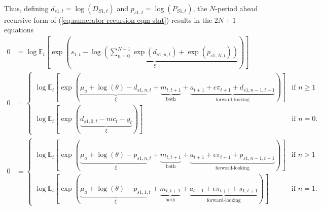 \documentclass[12 pt, oneside]{article}
\theoremstyle{definition}
\theoremstyle{definition}
\theoremstyle{definition}
\newcommand{\E}{\mathbb{E}}
\begin{document}
Thus, defining $d_{s1, t} = \log(D_{S1, t})$ and $p_{s1, t} = \log(P_{S1, t})$,
the $N$-period ahead recursive form of (\ref{eq:numerator recursion eqm stat}) results in the $2N + 1$ equations
\begin{align}
  0 & = \log\E_t\left[\exp\left(\underbrace{s_{1, t} - \log\left(\sum_{n = 0}^{N - 1}\exp(d_{s1, n, t}) + \exp(p_{s1, N, t})\right)}_{\xi}\right)\right]\\
  0 & =
      \begin{cases}
        \log\E_t\left[\exp\left(\underbrace{\mu_a + \log(\theta) - d_{s1, n, t}}_{\xi} + \underbrace{m_{t, t + 1}}_{\text{both}} + \underbrace{a_{t + 1} + \epsilon \pi_{t + 1} + d_{s1, n - 1, t + 1}}_{\text{forward-looking}}\right)\right] & \text{if } n \geq 1\\
        \log\E_t\left[\exp\left(\underbrace{d_{s1, 0, t} - mc_t - y_t}_{\xi}\right)\right] & \text{if } n = 0.
      \end{cases}\\
  0 & =
      \begin{cases}
        \log\E_t\left[\exp\left(\underbrace{\mu_a + \log(\theta) - p_{s1, n, t}}_{\xi} + \underbrace{m_{t, t + 1}}_{\text{both}} + \underbrace{a_{t + 1} + \epsilon \pi_{t + 1} + p_{s1, n - 1, t + 1}}_{\text{forward-looking}} \right)\right] & \text{if } n > 1\\
        \log\E_t\left[\exp\left(\underbrace{\mu_a + \log(\theta) - p_{s1, 1, t}}_{\xi} + \underbrace{m_{t, t + 1}}_{\text{both}} + \underbrace{a_{t + 1} + \epsilon \pi_{t + 1} + s_{1, t + 1}}_{\text{forward-looking}}\right)\right] & \text{if } n = 1.
      \end{cases}
\end{align}
\\
\end{document}
